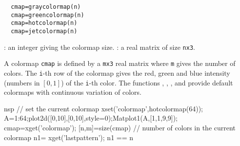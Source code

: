\begin{mandesc}
  \\ %
  \\ %
  \\ %
  \\ %
  \\ %
\end{mandesc}
\begin{calling_sequence}
\begin{verbatim}
  cmap=graycolormap(n)
  cmap=greencolormap(n)
  cmap=hotcolormap(n)
  cmap=jetcolormap(n)
\end{verbatim}
\end{calling_sequence}
\begin{parameters}
  \begin{varlist}
    : an integer giving the colormap size.
    : a real matrix of size \verb!nx3!.
\end{varlist}
\end{parameters}
\begin{mandescription}
  A colormap \verb!cmap! is defined by a \verb!mx3! real matrix where \verb!m!
  gives the number of colors. The \verb!i!-th row of the colormap gives the
  red, green and blue intensity (numbers in $[0,1]$) of the \verb!i!-th color.
  The functions ,
  , ,
  and  provide default colormaps with
  continuous variation of colors.
\end{mandescription}
\begin{examples}
  \begin{mintednsp}{nsp}
    // set the current colormap
    xset('colormap',hotcolormap(64));
    A=1:64;plot2d([0,10],[0,10],style=0);Matplot1(A,[1,1,9,9]);
    cmap=xget('colormap');
    [n,m]=size(cmap)
    // number of colors in the current colormap
    n1= xget('lastpattern');
    n1 == n
  \end{mintednsp}
\end{examples}
